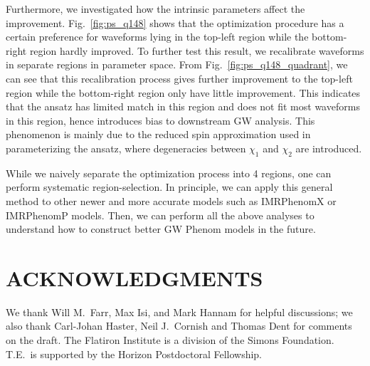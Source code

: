\documentclass[twocolumn]{aastex631}
\begin{document}
Furthermore, we investigated how the intrinsic parameters affect the
improvement. Fig.~\ref{fig:ps_q148} shows that the optimization procedure has a
certain preference for waveforms lying in the top-left region while the bottom-right 
region hardly improved. To further test this result, we recalibrate
waveforms in separate regions in parameter space. From Fig.~\ref{fig:ps_q148_quadrant}, 
we can see that this recalibration process gives further
improvement to the top-left region while the bottom-right region only have little 
improvement. This indicates that the ansatz has limited match in this region and 
does not fit most waveforms in this region, hence introduces bias to downstream GW 
analysis. This phenomenon is mainly due to the reduced spin approximation used in 
parameterizing the ansatz, where degeneracies between $\chi_1$ and $\chi_2$ are introduced. 

While we naively separate the optimization process into 4 regions, one can
perform systematic region-selection. In principle, we can apply this general
method to other newer and more accurate models such as IMRPhenomX or IMRPhenomP
models. Then, we can perform all the above analyses to understand how to
construct better GW Phenom models in the future.  

\section{ACKNOWLEDGMENTS}

We thank Will M.~Farr, Max Isi, and Mark Hannam for helpful discussions; we also
thank Carl-Johan Haster, Neil J.~Cornish and Thomas Dent for comments on the
draft. The Flatiron Institute is a division of the Simons Foundation. T.E.\ is
supported by the Horizon Postdoctoral Fellowship.

\end{document}
